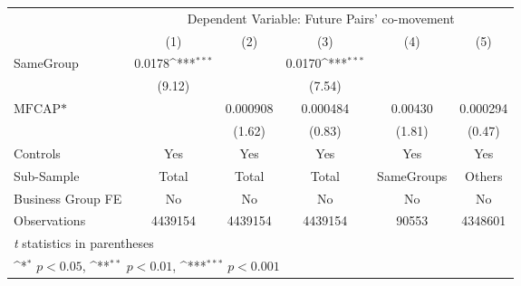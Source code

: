 {
\def\sym#1{\ifmmode^{#1}\else\(^{#1}\)\fi}
\begin{tabular}{l*{5}{c}}
\hline\hline
                &\multicolumn{5}{c}{Dependent Variable: Future Pairs' co-movement}                             \\\cmidrule(lr){2-6}
                &\multicolumn{1}{c}{(1)}         &\multicolumn{1}{c}{(2)}         &\multicolumn{1}{c}{(3)}         &\multicolumn{1}{c}{(4)}         &\multicolumn{1}{c}{(5)}         \\
\hline
SameGroup       &   0.0178\sym{***}&                  &   0.0170\sym{***}&                  &                  \\
                &   (9.12)         &                  &   (7.54)         &                  &                  \\
[1em]
$ \text{MFCAP*} $&                  & 0.000908         & 0.000484         &  0.00430         & 0.000294         \\
                &                  &   (1.62)         &   (0.83)         &   (1.81)         &   (0.47)         \\
\hline
Controls        &      Yes         &      Yes         &      Yes         &      Yes         &      Yes         \\
Sub-Sample      &    Total         &    Total         &    Total         &SameGroups         &   Others         \\
Business Group FE&       No         &       No         &       No         &       No         &       No         \\
Observations    &  4439154         &  4439154         &  4439154         &    90553         &  4348601         \\
\hline\hline
\multicolumn{6}{l}{\footnotesize \textit{t} statistics in parentheses}\\
\multicolumn{6}{l}{\footnotesize \sym{*} \(p<0.05\), \sym{**} \(p<0.01\), \sym{***} \(p<0.001\)}\\
\end{tabular}
}
